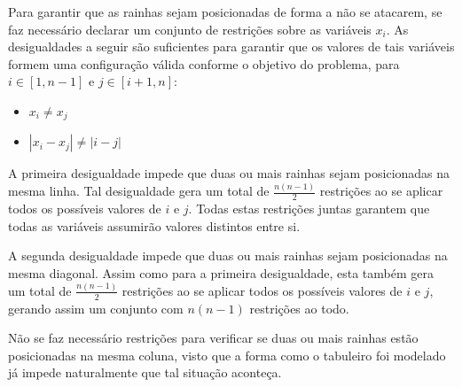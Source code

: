 Para garantir que as rainhas sejam posicionadas de forma a não se atacarem, se faz necessário declarar um conjunto de restrições sobre as variáveis $x_i$. As desigualdades a seguir são suficientes para garantir que os valores de tais variáveis formem uma configuração válida conforme o objetivo do problema, para $i \in [1,n-1]$ e $j \in [i+1,n]$:

\begin{itemize}
  \item $x_i \not= x_j$
  \item $|x_i - x_j| \not= |i - j|$
\end{itemize}

A primeira desigualdade impede que duas ou mais rainhas sejam posicionadas na mesma linha. Tal desigualdade gera um total de $\frac{n(n-1)}{2}$ restrições ao se aplicar todos os possíveis valores de $i$ e $j$. Todas estas restrições juntas garantem que todas as variáveis assumirão valores distintos entre si.

A segunda desigualdade impede que duas ou mais rainhas sejam posicionadas na mesma diagonal. Assim como para a primeira desigualdade, esta também gera um total de $\frac{n(n-1)}{2}$ restrições ao se aplicar todos os possíveis valores de $i$ e $j$, gerando assim um conjunto com $n(n-1)$ restrições ao todo.

Não se faz necessário restrições para verificar se duas ou mais rainhas estão posicionadas na mesma coluna, visto que a forma como o tabuleiro foi modelado já impede naturalmente que tal situação aconteça.
